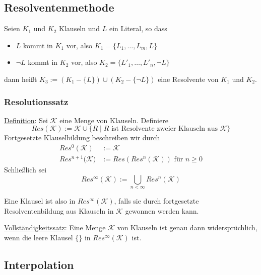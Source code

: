 \documentclass{scrartcl}
\begin{document}
\subsection{Resolventenmethode}

Seien $K_1$ und $K_2$ Klauseln und $L$ ein Literal, so dass

\begin{itemize}
	\item $L$ kommt in $K_1$ vor, also $K_1 = \{ L_1, \ldots, L_m, L \}$
	\item $\neg L$ kommt in $K_2$ vor, also $K_2 = \{ L'_1, \ldots, L'_n, \neg L \}$
\end{itemize}

dann heißt $K_3 := (K_1 - \{ L \}) \cup (K_2 - \{ \neg L \})$ eine Resolvente von $K_1$ und $K_2$.

\subsubsection{Resolutionssatz}

\underline{Definition}: Sei $\mathcal{K}$ eine Menge von Klauseln. Definiere
\begin{equation}
	Res(\mathcal{K}) := \mathcal{K} \cup \{ R \mid R \text{ ist Resolvente zweier Klauseln aus } \mathcal{K} \}
\end{equation}
Fortgesetzte Klauselbildung beschreiben wir durch
\begin{equation}
	\begin{split}
		Res^0(\mathcal{K}) &:= \mathcal{K} \\
		Res^{n+1}(\mathcal{K)} &:= Res(Res^n(\mathcal{K})) \text{ für } n \geq 0
	\end{split}
\end{equation}
Schließlich sei
\begin{equation}
	Res^\infty(\mathcal{K}) := \bigcup_{n < \infty} Res^n(\mathcal{K})
\end{equation}

Eine Klausel ist also in $Res^\infty(\mathcal{K})$, falls sie durch fortgesetzte Resolventenbildung aus Klauseln in $\mathcal{K}$ gewonnen werden kann.

\underline{Vollständigkeitssatz}: Eine Menge $\mathcal{K}$ von Klauseln ist genau dann widersprüchlich, wenn die leere Klausel $\{\}$ in $Res^\infty(\mathcal{K})$ ist.

\subsection{Interpolation}
\end{document}
